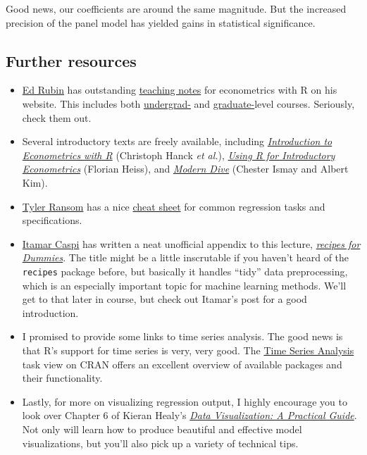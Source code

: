 \documentclass[
]{article}
\providecommand{\tightlist}{%
  \setlength{\itemsep}{0pt}\setlength{\parskip}{0pt}}
\begin{document}
Good news, our coefficients are around the same magnitude. But the
increased precision of the panel model has yielded gains in statistical
significance.

\hypertarget{further-resources}{%
\subsection{Further resources}\label{further-resources}}

\begin{itemize}
\tightlist
\item
  \href{https://twitter.com/edrubin}{Ed Rubin} has outstanding
  \href{http://edrub.in/teaching.html}{teaching notes} for econometrics
  with R on his website. This includes both
  \href{https://github.com/edrubin/EC421S19}{undergrad-} and
  \href{https://github.com/edrubin/EC525S19}{graduate-}level courses.
  Seriously, check them out.
\item
  Several introductory texts are freely available, including
  \href{https://www.econometrics-with-r.org/}{\emph{Introduction to
  Econometrics with R}} (Christoph Hanck \emph{et al.}),
  \href{http://www.urfie.net/}{\emph{Using R for Introductory
  Econometrics}} (Florian Heiss), and
  \href{https://moderndive.com/}{\emph{Modern Dive}} (Chester Ismay and
  Albert Kim).
\item
  \href{https://twitter.com/tyleransom}{Tyler Ransom} has a nice
  \href{https://github.com/tyleransom/EconometricsLabs/blob/master/tidyRcheatsheet.pdf}{cheat
  sheet} for common regression tasks and specifications.
\item
  \href{https://twitter.com/itamarcaspi}{Itamar Caspi} has written a
  neat unofficial appendix to this lecture,
  \href{https://itamarcaspi.rbind.io/post/recipes-for-dummies/}{\emph{recipes
  for Dummies}}. The title might be a little inscrutable if you haven't
  heard of the \texttt{recipes} package before, but basically it handles
  ``tidy'' data preprocessing, which is an especially important topic
  for machine learning methods. We'll get to that later in course, but
  check out Itamar's post for a good introduction.
\item
  I promised to provide some links to time series analysis. The good
  news is that R's support for time series is very, very good. The
  \href{https://cran.r-project.org/web/views/TimeSeries.html}{Time
  Series Analysis} task view on CRAN offers an excellent overview of
  available packages and their functionality.
\item
  Lastly, for more on visualizing regression output, I highly encourage
  you to look over Chapter 6 of Kieran Healy's
  \href{https://socviz.co/modeling.html}{\emph{Data Visualization: A
  Practical Guide}}. Not only will learn how to produce beautiful and
  effective model visualizations, but you'll also pick up a variety of
  technical tips.
\end{itemize}
\end{document}
